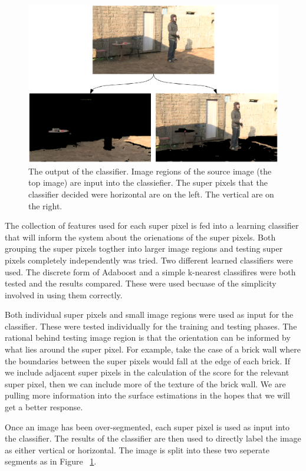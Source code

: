 \documentclass[times,10pt,twocolumn]{article}
\begin{document}
\begin{figure}[t]
  \includegraphics[keepaspectratio=true, width=\textwidth]{split.eps}
  \caption{The output of the classifier. Image regions of the source image
           (the top image) are input into the classiefier. The super pixels
           that the classifier decided were horizontal are on the left. The
           vertical are on the right. }
  \label{fig:spliting}
\end{figure}

The collection of features used for each super pixel is fed into a learning
classifier that will inform the system about the orienations of the super
pixels. Both grouping the super pixels togther into larger image regions and
testing super pixels completely independently was tried. Two different learned
classifiers were used. The discrete form of Adaboost and a simple k-nearest
classifires were both tested and the results compared. These were used becuase
of the simplicity involved in using them correctly.

Both individual super pixels and small image regions were used as input for the
classifier. These were tested individually for the training and testing phases.
The rational behind testing image region is that the orientation can be
informed by what lies around the super pixel. For example, take the case of a
brick wall where the boundaries between the super pixels would fall at the edge
of each brick. If we include adjacent super pixels in the calculation of the
score for the relevant super pixel, then we can include more of the texture of
the brick wall. We are pulling more information into the surface estimations in
the hopes that we will get a better response.

Once an image has been over-segmented, each super pixel is used as input into
the classifier. The results of the classifier are then used to directly label
the image as either vertical or horizontal. The image is split into these two
seperate segments as in Figure ~\ref{fig:spliting}.
\end{document}
